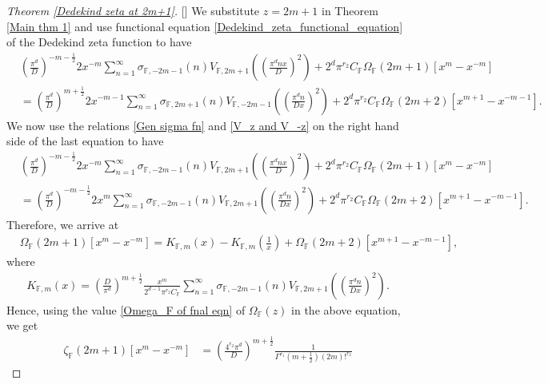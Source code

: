 \documentclass[12pt,reqno]{amsart}
\renewcommand{\(}{\left\(}
\renewcommand{\)}{\right\)}
\renewcommand{\[}{\left\[}
\renewcommand{\]}{\right\]}
\numberwithin{equation}{section}
\theoremstyle{plain}
\begin{document}
\begin{proof}[Theorem \rm{\ref{Dedekind zeta at 2m+1}}][]
We substitute $z=2m+1$ in Theorem \ref{Main thm 1} and use functional equation \eqref{Dedekind_zeta_functional_equation} of the Dedekind zeta function to have
\begin{align*}
&\left(\frac{\pi^d}{D}\right)^{-m-\frac{1}{2}}\!\!2x^{-m}\sum_{n=1}^{\infty}\sigma_{\mathbb{F}, -2m-1}(n)V_{\mathbb{F}, 2m+1}\left(\left(\frac{\pi^d n x}{D}\right)^2\right) + 2^d\pi^{r_2}C_{\mathbb{F}}\Omega_{\mathbb{F}}(2m+1)\left[x^{m} - x^{-m}\right] \\
&= \left(\frac{\pi^d}{D}\right)^{m+\frac{1}{2}}\!\!2x^{-m-1}\sum_{n=1}^{\infty}\sigma_{\mathbb{F}, 2m+1}(n)V_{\mathbb{F}, -2m-1}\left(\left(\frac{\pi^d n}{Dx}\right)^2\right) + 2^d\pi^{r_2}C_{\mathbb{F}}\Omega_{\mathbb{F}}(2m+2)\left[x^{m+1} - x^{-m-1}\right].
\end{align*}
We now use the relations \eqref{Gen sigma fn} and \eqref{V_z and V_-z} on the right hand side of the last equation to have
\begin{align*}
&\left(\frac{\pi^d}{D}\right)^{-m-\frac{1}{2}}\!\!2x^{-m}\sum_{n=1}^{\infty}\sigma_{\mathbb{F}, -2m-1}(n)V_{\mathbb{F}, 2m+1}\left(\left(\frac{\pi^d n x}{D}\right)^2\right) + 2^d\pi^{r_2}C_{\mathbb{F}}\Omega_{\mathbb{F}}(2m+1)\left[x^{m} - x^{-m}\right] \\
&= \left(\frac{\pi^d}{D}\right)^{-m-\frac{1}{2}}\!\!2x^m\sum_{n=1}^{\infty}\sigma_{\mathbb{F}, -2m-1}(n)V_{\mathbb{F}, 2m+1}\left(\left(\frac{\pi^d n }{Dx}\right)^2\right) + 2^d\pi^{r_2}C_{\mathbb{F}}\Omega_{\mathbb{F}}(2m+2)\left[x^{m+1} - x^{-m-1}\right].
\end{align*}
Therefore, we arrive at
\begin{align*}
&\Omega_{\mathbb{F}}(2m+1)\left[x^{m} - x^{-m}\right] = K_{\mathbb{F}, m}(x) - K_{\mathbb{F}, m}\left(\frac{1}{x}\right) + \Omega_{\mathbb{F}}(2m+2)\left[x^{m+1} - x^{-m-1}\right],
\end{align*}
where
\begin{align*}
K_{\mathbb{F}, m}(x) = \left(\frac{D}{\pi^d}\right)^{m+\frac{1}{2}}\frac{x^m}{2^{d-1}\pi^{r_2}C_{\mathbb{F}}}\sum_{n=1}^{\infty}\sigma_{\mathbb{F}, -2m-1}(n)V_{\mathbb{F}, 2m+1}\left(\left(\frac{\pi^d n}{Dx}\right)^2\right).
\end{align*}
Hence, using the value \eqref{Omega_F of fnal eqn} of $\Omega_\mathbb{F}(z)$  in the above equation, we get
\begin{align}
\zeta_{\mathbb{F}}(2m+1)  \left[x^{m} - x^{-m}\right] & =  \left( \frac{4^{r_2} \pi^d}{D}\right)^{m+\frac{1}{2}} \frac{1}{\Gamma^{r_1}\left( m+\frac{1}{2} \right) {(2m)!}^{r_2}}

\end{align}
\end{proof}
\end{document}
